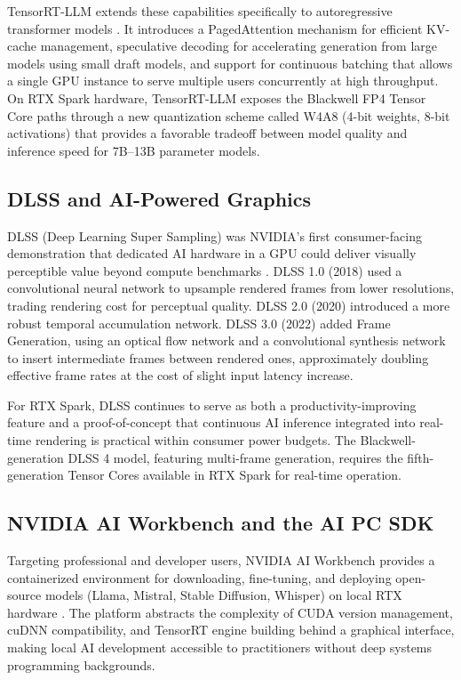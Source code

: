 \documentclass[conference]{IEEEtran}
\begin{document}
TensorRT-LLM extends these capabilities specifically to autoregressive transformer models \cite{pope2023efficiently}. It introduces a PagedAttention mechanism \cite{kwon2023efficient} for efficient KV-cache management, speculative decoding for accelerating generation from large models using small draft models, and support for continuous batching that allows a single GPU instance to serve multiple users concurrently at high throughput. On RTX Spark hardware, TensorRT-LLM exposes the Blackwell FP4 Tensor Core paths through a new quantization scheme called W4A8 (4-bit weights, 8-bit activations) that provides a favorable tradeoff between model quality and inference speed for 7B--13B parameter models.

\subsection{DLSS and AI-Powered Graphics}

DLSS (Deep Learning Super Sampling) was NVIDIA's first consumer-facing demonstration that dedicated AI hardware in a GPU could deliver visually perceptible value beyond compute benchmarks \cite{liu2020neural}. DLSS 1.0 (2018) used a convolutional neural network to upsample rendered frames from lower resolutions, trading rendering cost for perceptual quality. DLSS 2.0 (2020) introduced a more robust temporal accumulation network. DLSS 3.0 (2022) added Frame Generation, using an optical flow network and a convolutional synthesis network to insert intermediate frames between rendered ones, approximately doubling effective frame rates at the cost of slight input latency increase.

For RTX Spark, DLSS continues to serve as both a productivity-improving feature and a proof-of-concept that continuous AI inference integrated into real-time rendering is practical within consumer power budgets. The Blackwell-generation DLSS 4 model, featuring multi-frame generation, requires the fifth-generation Tensor Cores available in RTX Spark for real-time operation.

\subsection{NVIDIA AI Workbench and the AI PC SDK}

Targeting professional and developer users, NVIDIA AI Workbench provides a containerized environment for downloading, fine-tuning, and deploying open-source models (Llama, Mistral, Stable Diffusion, Whisper) on local RTX hardware \cite{nvidia2024workbench}. The platform abstracts the complexity of CUDA version management, cuDNN compatibility, and TensorRT engine building behind a graphical interface, making local AI development accessible to practitioners without deep systems programming backgrounds.
\end{document}
